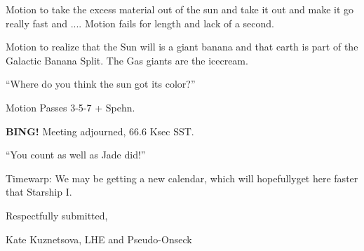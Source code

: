 \documentclass[10pt]{article}
\newcommand{\bing}{{\bf BING!} }
\begin{document}
Motion to take the excess material out of the sun and take it out and make it go really fast and .... Motion fails for length and lack of a second. 

Motion to realize that the Sun will is a giant banana and that earth is part of the Galactic Banana Split. The Gas giants are the icecream.

``Where do you think the sun got its color?''

Motion Passes 3-5-7 + Spehn.

\bing
\noindent
Meeting adjourned, 66.6 Ksec SST.

``You count as well as Jade did!''

Timewarp: We may be getting a new calendar, which will hopefullyget here faster that Starship I. 
\vspace{18pt}

\centerline{Respectfully submitted,}
\centerline{Kate Kuznetsova, LHE and Pseudo-Onseck}
\end{document}
